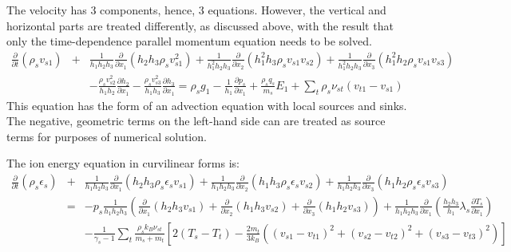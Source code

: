 \documentclass[11pt,letterpaper]{article}
\begin{document}
The velocity has 3 components, hence, 3 equations.  However, the vertical and horizontal parts are treated differently, as discussed above, with the result that only the time-dependence parallel momentum equation needs to be solved.  %
\begin{eqnarray}
\frac{\partial}{\partial t} \left( \rho_s v_{s1} \right) &+& \frac{1}{h_1 h_2 h_3} \frac{\partial}{\partial x_1} \left( h_2 h_3 \rho_s v_{s1}^2 \right) + \frac{1}{h_1^2 h_2 h_3} \frac{\partial}{\partial x_2} \left( h_1^2 h_3 \rho_s v_{s1} v_{s2} \right) + \frac{1}{h_1^2 h_2 h_3} \frac{\partial}{\partial x_3} \left( h_1^2 h_2 \rho_s v_{s1} v_{s3} \right) \nonumber \\
~ &~& - \frac{\rho_s v_{s2}^2}{h_1 h_2} \frac{\partial h_2}{\partial x_1} - \frac{\rho_s v_{s3}^2}{h_1 h_3} \frac{\partial h_3}{\partial x_1}  = \rho_s g_1 - \frac{1}{h_1} \frac{\partial p_s}{\partial x_1} + \frac{\rho_s q_s}{m_s} E_1 + \sum_t \rho_s \nu_{st} \left( v_{t1} - v_{s1} \right) \label{eqn:momentumcoord}
\end{eqnarray}
This equation has the form of an advection equation with local sources and sinks.  The negative, geometric terms on the left-hand side can are treated as source terms for purposes of numerical solution.

The ion energy equation in curvilinear forms is:  
\begin{eqnarray}
\frac{\partial}{\partial t} \left( \rho_s \epsilon_s \right) &+& \frac{1}{h_1 h_2 h_3} \frac{\partial}{\partial x_1} \left( h_2 h_3 \rho_s \epsilon_s v_{s1} \right) + \frac{1}{h_1 h_2 h_3} \frac{\partial}{\partial x_2} \left( h_1 h_3 \rho_s \epsilon_s v_{s2} \right) + \frac{1}{h_1 h_2 h_3} \frac{\partial}{\partial x_3} \left( h_1 h_2 \rho_s \epsilon_s v_{s3} \right) \nonumber \\
&=& -p_s \frac{1}{h_1 h_2 h_3} \left( \frac{\partial}{\partial x_1} \left( h_2 h_3 v_{s1} \right) + \frac{\partial}{\partial x_2} \left( h_1 h_3 v_{s2} \right) + \frac{\partial}{\partial x_3} \left( h_1 h_2 v_{s3} \right) \right) + \frac{1}{h_1 h_2 h_3} \frac{\partial}{\partial x_1} \left( \frac{h_2 h_3}{h_1} \lambda_s \frac{\partial T_s}{\partial x_1} \right) \nonumber \\
&~& - \frac{1}{\gamma_s - 1} \sum_t \frac{\rho_s k_B \nu_{st}}{m_s + m_t} \left[ 2 \left( T_s - T_t \right) - \frac{2 m_t}{3 k_B} \left( \left( v_{s1} - v_{t1} \right)^2 + \left( v_{s2} - v_{t2} \right)^2 + \left( v_{s3} - v_{t3} \right)^2 \right) \right] \label{eqn:ionenergycoord}
\end{eqnarray}
\end{document}
